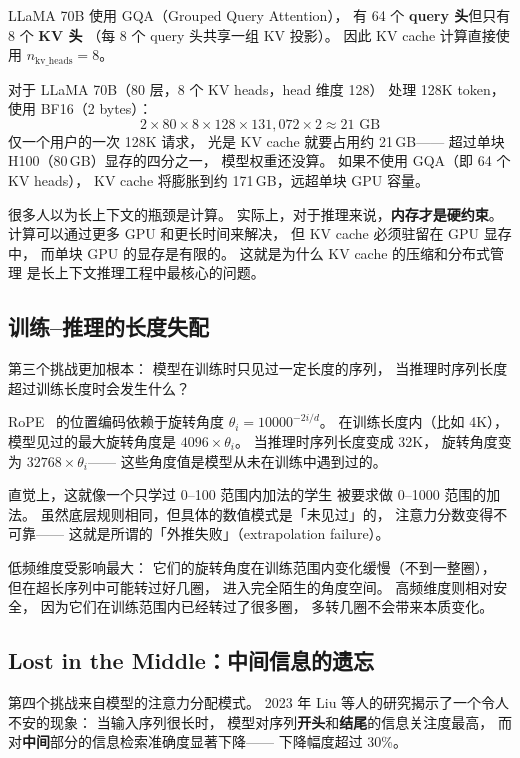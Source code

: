 LLaMA 70B 使用 GQA（Grouped Query Attention），
有 64 个 \textbf{query 头}但只有 8 个 \textbf{KV 头}
（每 8 个 query 头共享一组 KV 投影）。
因此 KV cache 计算直接使用 $n_{\text{kv\_heads}} = 8$。

对于 LLaMA 70B（80 层，8 个 KV heads，head 维度 128）
处理 128K token，使用 BF16（2 bytes）：
\[
  2 \times 80 \times 8 \times 128 \times 131{,}072 \times 2
  \approx 21 \text{ GB}
\]
仅一个用户的一次 128K 请求，
光是 KV cache 就要占用约 21\,GB——
超过单块 H100（80\,GB）显存的四分之一，
模型权重还没算。
如果不使用 GQA（即 64 个 KV heads），
KV cache 将膨胀到约 171\,GB，远超单块 GPU 容量。

\begin{warnbox}
很多人以为长上下文的瓶颈是计算。
实际上，对于推理来说，\textbf{内存才是硬约束}。
计算可以通过更多 GPU 和更长时间来解决，
但 KV cache 必须驻留在 GPU 显存中，
而单块 GPU 的显存是有限的。
这就是为什么 KV cache 的压缩和分布式管理
是长上下文推理工程中最核心的问题。
\end{warnbox}

\subsection{训练--推理的长度失配}

第三个挑战更加根本：
模型在训练时只见过一定长度的序列，
当推理时序列长度超过训练长度时会发生什么？

RoPE~\cite{su2021rope} 的位置编码依赖于旋转角度
$\theta_i = 10000^{-2i/d}$。
在训练长度内（比如 4K），
模型见过的最大旋转角度是 $4096 \times \theta_i$。
当推理时序列长度变成 32K，
旋转角度变为 $32768 \times \theta_i$——
这些角度值是模型从未在训练中遇到过的。

直觉上，这就像一个只学过 0--100 范围内加法的学生
被要求做 0--1000 范围的加法。
虽然底层规则相同，但具体的数值模式是「未见过」的，
注意力分数变得不可靠——
这就是所谓的「外推失败」（extrapolation failure）。

低频维度受影响最大：
它们的旋转角度在训练范围内变化缓慢（不到一整圈），
但在超长序列中可能转过好几圈，
进入完全陌生的角度空间。
高频维度则相对安全，
因为它们在训练范围内已经转过了很多圈，
多转几圈不会带来本质变化。

\subsection{Lost in the Middle：中间信息的遗忘}

第四个挑战来自模型的注意力分配模式。
2023 年 Liu 等人的研究揭示了一个令人不安的现象：
当输入序列很长时，
模型对序列\textbf{开头}和\textbf{结尾}的信息关注度最高，
而对\textbf{中间}部分的信息检索准确度显著下降——
下降幅度超过 30\%。

